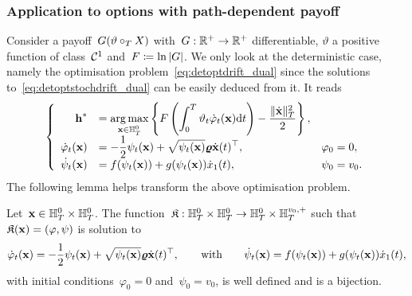 \subsubsection{\textbf{Application to options with path-dependent payoff}}
\label{sec:PayoffPathDepG}
\sloppy Consider a payoff~$G(\vartheta\circ_{T} X)$ with~${G:\mathbb{R}^{+} \rightarrow \mathbb{R}^{+}}$ differentiable, 
$\vartheta$ a positive function of class~$\mathcal{C}^1$ and~$F \coloneqq \ln|G|$. 
We only look at the deterministic case, 
namely the optimisation problem~\eqref{eq:detoptdrift_dual} since the solutions to~\eqref{eq:detoptstochdrift_dual} can be easily deduced from it. It reads
\begin{equation*}
\left\{
\begin{array}{rll}
\boldsymbol{\mathrm{h}}^* & = \displaystyle \operatorname*{arg\,max}\limits_{\boldsymbol{\mathrm{x}}\in \mathbb{H}_T^0} 
\left\{F\left(\int_0^T\vartheta_t \dot{\varphi}_t(\boldsymbol{\mathrm{x}}) \mathrm{d} t\right) - \frac{\|\dot{\boldsymbol{\mathrm{x}}}\|_{T}^2}{2}\right\},\\
\dot{\varphi}_t(\boldsymbol{\mathrm{x}}) & = \displaystyle -\frac{1}{2}\psi_t(\boldsymbol{\mathrm{x}}) + \sqrt{\psi_t(\boldsymbol{\mathrm{x}})}\boldsymbol{\mathrm{\varrho}} \dot{\boldsymbol{\mathrm{x}}}(t)^\top, & \varphi_0 = 0,\\
\dot{\psi}_t(\boldsymbol{\mathrm{x}}) & = \displaystyle f(\psi_t(\boldsymbol{\mathrm{x}})) + g(\psi_t(\boldsymbol{\mathrm{x}})) \dot{x}_1(t), & \psi_0 = v_0.
\end{array}
\right.
\end{equation*}
The following lemma helps transform the above optimisation problem.
\begin{lemma}\label{lem:Simplify}
Let~$\boldsymbol{\mathrm{x}}\in \mathbb{H}_T^0 \times \mathbb{H}_T^0$. The function~$\mathfrak{K}:\mathbb{H}_T^0 \times \mathbb{H}_T^0 \rightarrow \mathbb{H}_T^0\times \mathbb{H}_T^{v_0,+}$ such that~$\mathfrak{K}(\boldsymbol{\mathrm{x}})=(\varphi,\psi)$ is solution to
$$
\dot{\varphi}_t(\boldsymbol{\mathrm{x}})  = -\frac{1}{2}\psi_t(\boldsymbol{\mathrm{x}}) + \sqrt{\psi_t(\boldsymbol{\mathrm{x}})}\boldsymbol{\mathrm{\varrho}} \dot{\boldsymbol{\mathrm{x}}}(t)^\top,
\qquad\text{with}\qquad
\dot{\psi}_t(\boldsymbol{\mathrm{x}}) = f(\psi_t(\boldsymbol{\mathrm{x}})) + g(\psi_t(\boldsymbol{\mathrm{x}})) \dot{x}_1(t),
$$
with initial conditions~$\varphi_0 = 0$ and~$\psi_0 = v_0$, is well defined and is a bijection.
\end{lemma}
